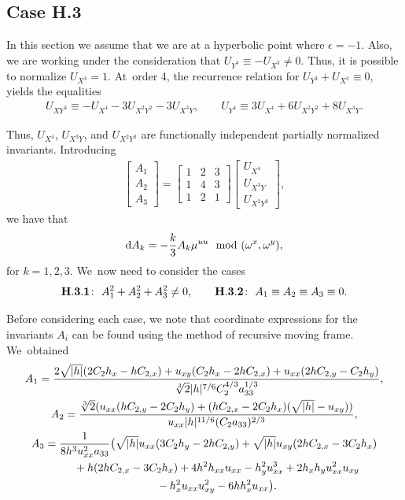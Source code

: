 \documentclass[pdftex]{sigma}%
\numberwithin{equation}{section}
\begin{document}
\subsection{Case H.3}

In this section we assume that we are at a hyperbolic point where $\epsilon=-1$. Also, we are working under the consideration that $U_{Y^3} \equiv - U_{X^3}\neq 0$. Thus, it is possible to normalize $U_{X^3}=1$. At~order 4, the recurrence relation for $U_{Y^3} + U_{X^3}\equiv 0$, yields the equalities
\begin{gather*}
U_{XY^3} \equiv - U_{X^4} - 3U_{X^2Y^2} - 3U_{X^3Y}, \qquad
U_{Y^4} \equiv 3U_{X^4}+6U_{X^2Y^2} + 8U_{X^3Y}.
\end{gather*}

{\samepage
Thus, $U_{X^4}$, $U_{X^3Y}$, and $U_{X^2Y^2}$ are functionally independent partially normalized invariants. Introducing
\begin{gather*}
\begin{bmatrix}
A_1 \\ A_2 \\ A_3
\end{bmatrix} =
\begin{bmatrix}
1 & 2 & 3 \\
1 & 4 & 3 \\
1 & 2 & 1
\end{bmatrix}
\begin{bmatrix}
U_{X^4} \\ U_{X^3Y} \\ U_{X^2Y^2}
\end{bmatrix}\!,
\end{gather*}
we have that
\begin{gather*}
{\rm d}A_k = -\frac{k}{3} A_k \mu^{uu} \mod(\omega^x,\omega^y),
\end{gather*}
for $k=1,2,3$. We~now need to consider the cases
\begin{gather*}
 {\bf H.3.1}\colon\ A_1^2+A_2^2+A_3^2\neq 0,\qquad
 {\bf H.3.2}\colon\ A_1\equiv A_2\equiv A_3\equiv 0.
\end{gather*}
}


Before considering each case, we note that coordinate expressions for the invariants $A_i$ can be found using the method of recursive moving frame. We~obtained
\begin{gather}
A_1 = \frac{2\sqrt{|h|}(2C_2h_x-hC_{2,x}) + u_{xy}(C_2h_x-2hC_{2,x}) + u_{xx}(2hC_{2,y} - C_2h_y)}{\sqrt[3]{2}|h|^{7/6}C_2^{4/3}a_{33}^{1/3}},\nonumber
\\
A_2 = \frac{\sqrt[3]{2}(u_{xx}(hC_{2,y} - 2C_2h_y)+(hC_{2,x}-2C_2h_x)(\sqrt{|h|}-u_{xy}))}{u_{xx}|h|^{11/6}(C_2a_{33})^{2/3}},\nonumber
\\
A_3 = \frac{1}{8h^3 u_{xx}^2 a_{33}}\big(\sqrt{|h|}u_{xx}(3C_2h_y - 2hC_{2,y})+\sqrt{|h|}u_{xy}(2hC_{2,x}-3C_2h_x)\nonumber
\\ \hphantom{A_3 =}
{}+h(2hC_{2,x}-3C_2h_x)+4h^2h_{xx}u_{xx}-h_y^2u_{xx}^3+2h_xh_yu_{xx}^2u_{xy}\nonumber
\\ \hphantom{A_3 =}
{}-h_x^2u_{xx}u_{xy}^2-6hh_x^2u_{xx}\big).
\label{eq:A invariants}
\end{gather}
\end{document}
